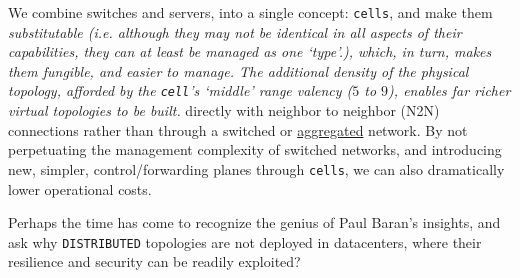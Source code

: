 \documentclass[../HFT-main.tex]{subfiles}
\begin{document}
We combine switches and servers, into a single concept:  \texttt{cells}, and make them \emph{substitutable (i.e. although they may not be identical in all aspects of their capabilities, they can at least be managed as one `type'.), which, in turn, makes them \emph{fungible}, and easier to manage. The additional density of the physical topology, afforded by the \texttt{cell}'s  `middle' range valency ($5$ to $9$), enables far richer virtual topologies to be built.} directly with neighbor to neighbor (N2N) %
connections rather than through a switched or \href{http://www.plexxi.com/2013/07/the-problem-with-everything-in-aggregation/}{aggregated} network. By not perpetuating the management complexity of switched networks, and introducing new, simpler, control/forwarding planes through \texttt{cells}, we can also dramatically lower  operational costs. 




\vspace{-2pt}
\begin{framed}
\noindent Perhaps the time has come to recognize the genius of Paul Baran's insights, and ask why \texttt{DISTRIBUTED} topologies are not deployed in datacenters, where their resilience and security can be readily exploited?
\end{framed}
\vspace{-16pt}
\end{document}

